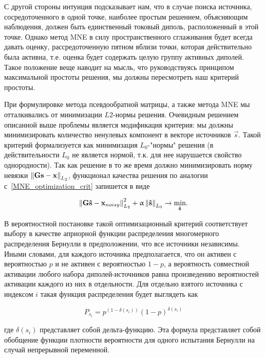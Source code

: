 С другой стороны интуиция подсказывает нам, что в случае поиска источника,
сосредоточенного в одной точке, наиболее простым решением, объясняющим
наблюдения, должен быть единственный токовый диполь, расположенный в этой
точке. Однако метод MNE в силу пространственного сглаживания будет всегда
давать оценку, рассредоточенную пятном вблизи точки, которая действительно была
активна, т.е. оценка будет содержать целую группу активных диполей.
Такое положение веще наводит на мысль, что руководствуясь принципом
максимальной простоты решения, мы должны пересмотреть наш критерий простоты.

При формулировке метода псевдообратной матрицы, а также метода MNE мы
отталкивались от минимизации $L2$-нормы решения. Очевидным решением описанной
выше проблемы является модификация критерия: мы должны минимизировать
количество ненулевых компонент в векторе источников $\vec{s}$. Такой
критерий формализуется как минимизация $L_0$-"нормы" решения (в действительности $L_0$ не является нормой,
т.к. для нее нарушается свойство однородности). Так как решение в то же время
должно минимизировать норму невязки $\left\lVert\mathbf{Gs - x}\right\rVert_{L_2}$, функционал
качества решения по аналогии с~\ref{MNE_optimization_crit} запишется в виде

\begin{equation}
    \left\lVert\mathbf{G\hat{s} - x}_{noisy}\right\rVert^2_{L_2} + \upalpha\left\lVert\mathbf{\hat{s}}\right\rVert_{L_0}
    \rightarrow \underset{\mathbf{\hat{s}}}{\min}.
    \label{l0_optimization_crit}
\end{equation}

В вероятностной постановке такой оптимизационный критерий соответствует
выбору в качестве априорной функции распределения многомерного распределения
Бернулли в предположении, что все источники независимы. Иными словами,
для каждого источника предполагается, что он активен с вероятностью
$p$ и не активен с вероятностью $1-p$, а вероятность совместной активации
любого набора диполей-источников равна произведению вероятностей активации
каждого из них в отдельности.
Для отдельно взятого источника с индексом
$i$ такая функция распределения будет выглядеть как

\begin{equation}
    P_{s_i} = p^{(1 - \delta(s_i))} (1-p)^{\delta(s_i)}
\end{equation}

где $\delta(s_i)$ представляет собой дельта-функцию. Эта формула представляет
собой обобщение функции плотности вероятности для одного испытания Бернулли
на случай непрерывной переменной.

